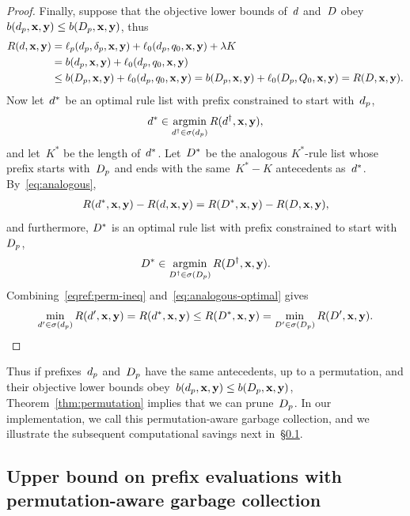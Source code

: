 \begin{proof}
Finally, suppose that the objective lower bounds of~${d}$ and~${D}$
obey ${b(d_p, \mathbf{x}, \mathbf{y}) \le b(D_p, \mathbf{x}, \mathbf{y})}$, thus
\begin{align}
\Obj(\RL, \x, \y)
&= \Loss_p(\Prefix, \Labels, \x, \y) + \Loss_0(\Prefix, \Default, \x, \y) + \Reg K \nn \\
&= b(\Prefix, \x, \y) + \Loss_0(\Prefix, \Default, \x, \y) \nn \\
&\le b(\PrefixB, \x, \y) + \Loss_0(\Prefix, \Default, \x, \y)
= b(\PrefixB, \x, \y) + \Loss_0(\PrefixB, \DefaultB, \x, \y)
= \Obj(\RLB, \x, \y).
\label{eqref:perm-ineq}
\end{align}
Now let~${d}^*$ be an optimal rule list with prefix
constrained to start with~$d_p$,
\begin{align}
\RL^* \in \argmin_{\RL^\dagger \in \StartsWith(\Prefix)} \Obj(\RL^\dagger, \x, \y),
\end{align}
and let~$K^*$ be the length of~${d}^*$.
%
Let~${D}^*$ be the analogous $K^*$-rule list whose prefix starts
with~$D_p$ and ends with the same~${K^* - K}$ antecedents as~${d}^*$.
%
By~\eqref{eq:analogous},
\begin{align}
\Obj(\RL^*, \x, \y) - \Obj(\RL, \x, \y)
= \Obj(\RLB^*, \x, \y) - \Obj(\RLB, \x, \y),
\label{eq:analogous-optimal}
\end{align}
and furthermore, ${D}^*$ is an optimal rule list
with prefix constrained to start with~$D_p$,
\begin{align}
\RLB^* \in \argmin_{\RLB^\dagger \in \StartsWith(\PrefixB)} \Obj(\RLB^\dagger, \x, \y).
\end{align}
Combining~\eqref{eqref:perm-ineq} and~\eqref{eq:analogous-optimal} gives
\begin{align}
\min_{\RL' \in \StartsWith(\Prefix)} \Obj(\RL', \x, \y)
= \Obj(\RL^*, \x, \y) \le \Obj(\RLB^*, \x, \y)
= \min_{\RLB' \in \StartsWith(\PrefixB)} \Obj(\RLB', \x, \y).
\end{align}
\end{proof}

Thus if prefixes~$d_p$ and~$D_p$ have the same antecedents,
up to a permutation, and their objective lower bounds
obey~${b(d_p, \mathbf{x}, \mathbf{y}) \le b(D_p, \mathbf{x}, \mathbf{y})}$,
Theorem~\ref{thm:permutation} implies that we can prune~$D_p$.
%
In our implementation, we call this permutation-aware
garbage collection, and we illustrate the subsequent
computational savings next in~\S\ref{sec:permutation-counting}.

\subsection{Upper bound on prefix evaluations with permutation-aware garbage collection}
\label{sec:permutation-counting}

